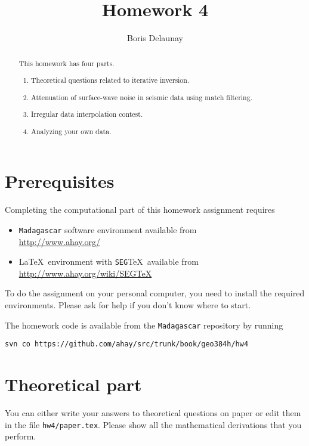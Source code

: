 \author{Boris Delaunay}
\title{Homework 4}

\begin{abstract}
  This homework has four parts. 
  \begin{enumerate}
  \item Theoretical questions related to iterative inversion.
  \item Attenuation of surface-wave noise in 
        seismic data using match filtering.
  \item Irregular data interpolation contest.
  \item Analyzing your own data.
  \end{enumerate}
\end{abstract}

\section{Prerequisites}

Completing the computational part of this homework assignment requires
\begin{itemize}
\item \texttt{Madagascar} software environment available from \\
\url{http://www.ahay.org/}
\item \LaTeX\ environment with \texttt{SEG}\TeX\ available from \\ 
\url{http://www.ahay.org/wiki/SEGTeX}
\end{itemize}
To do the assignment on your personal computer, you need to install
the required environments. Please ask for help if you don't know where
to start.

The homework code is available from the \texttt{Madagascar} repository
by running
\begin{verbatim}
svn co https://github.com/ahay/src/trunk/book/geo384h/hw4
\end{verbatim}

\section{Theoretical part}

You can either write your answers to theoretical questions on paper or
edit them in the file \texttt{hw4/paper.tex}. Please show all the
mathematical derivations that you perform.

